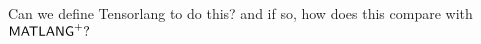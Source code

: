 \begin{todo}
Can we define Tensorlang to do this? and if so, how does this compare with $\mathsf{MATLANG}^{\sf +}?$
\end{todo}
%
%
%
%
%
%
%
%
%
%
%
%



